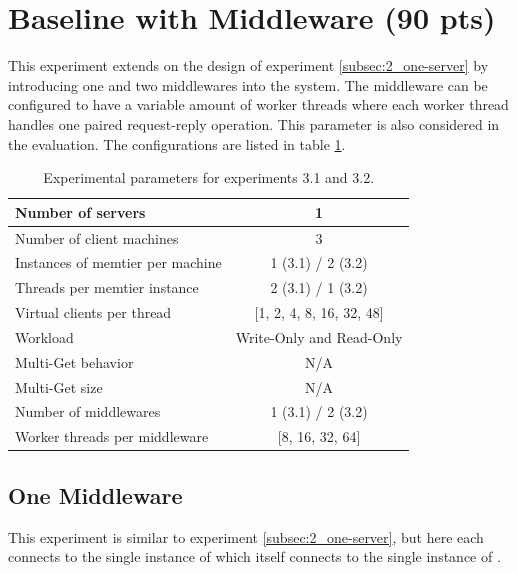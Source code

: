 \section{Baseline with Middleware (90 pts)\label{sec:3}}

    This experiment extends on the design of experiment \ref{subsec:2_one-server} by introducing one and two middlewares
    into the system. The middleware can be configured to have a variable amount of worker threads where each worker
    thread handles one paired request-reply operation. This parameter is also considered in the evaluation. The
    configurations are listed in table \ref{tab:30_setup}.

    \begin{table}
        \scriptsize{
            \begin{tabular}{|l|c|}
                \hline Number of servers                & 1 \\
                \hline Number of client machines        & 3 \\
                \hline Instances of memtier per machine & 1 (3.1) / 2 (3.2) \\
                \hline Threads per memtier instance     & 2 (3.1) / 1 (3.2) \\
                \hline Virtual clients per thread       & [1, 2, 4, 8, 16, 32, 48] \\
                \hline Workload                         & Write-Only and Read-Only \\
                \hline Multi-Get behavior               & N/A \\
                \hline Multi-Get size                   & N/A \\
                \hline Number of middlewares            & 1 (3.1) / 2 (3.2) \\
                \hline Worker threads per middleware    & [8, 16, 32, 64]  \\
                \hline
            \end{tabular}
        }
            \caption{Experimental parameters for experiments 3.1 and 3.2.\label{tab:30_setup}}
    \end{table}

    \subsection{One Middleware\label{subsec:3_one-middleware}}

        This experiment is similar to experiment \ref{subsec:2_one-server}, but here each \cli{} connects to the single
        instance of \mw{} which itself connects to the single instance of \srv{}.


